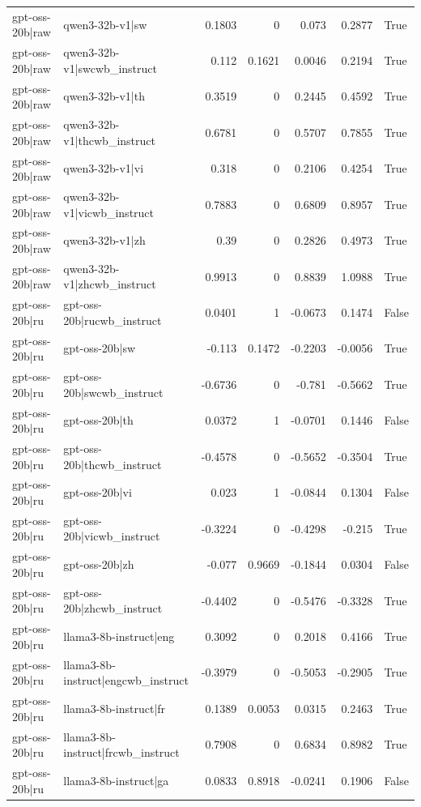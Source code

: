 \begin{table}
\begin{tabular}{l l r r r r l}
gpt-oss-20b|raw & qwen3-32b-v1|sw & 0.1803 & 0 & 0.073 & 0.2877 & True \\
gpt-oss-20b|raw & qwen3-32b-v1|swcwb_instruct & 0.112 & 0.1621 & 0.0046 & 0.2194 & True \\
gpt-oss-20b|raw & qwen3-32b-v1|th & 0.3519 & 0 & 0.2445 & 0.4592 & True \\
gpt-oss-20b|raw & qwen3-32b-v1|thcwb_instruct & 0.6781 & 0 & 0.5707 & 0.7855 & True \\
gpt-oss-20b|raw & qwen3-32b-v1|vi & 0.318 & 0 & 0.2106 & 0.4254 & True \\
gpt-oss-20b|raw & qwen3-32b-v1|vicwb_instruct & 0.7883 & 0 & 0.6809 & 0.8957 & True \\
gpt-oss-20b|raw & qwen3-32b-v1|zh & 0.39 & 0 & 0.2826 & 0.4973 & True \\
gpt-oss-20b|raw & qwen3-32b-v1|zhcwb_instruct & 0.9913 & 0 & 0.8839 & 1.0988 & True \\
gpt-oss-20b|ru & gpt-oss-20b|rucwb_instruct & 0.0401 & 1 & -0.0673 & 0.1474 & False \\
gpt-oss-20b|ru & gpt-oss-20b|sw & -0.113 & 0.1472 & -0.2203 & -0.0056 & True \\
gpt-oss-20b|ru & gpt-oss-20b|swcwb_instruct & -0.6736 & 0 & -0.781 & -0.5662 & True \\
gpt-oss-20b|ru & gpt-oss-20b|th & 0.0372 & 1 & -0.0701 & 0.1446 & False \\
gpt-oss-20b|ru & gpt-oss-20b|thcwb_instruct & -0.4578 & 0 & -0.5652 & -0.3504 & True \\
gpt-oss-20b|ru & gpt-oss-20b|vi & 0.023 & 1 & -0.0844 & 0.1304 & False \\
gpt-oss-20b|ru & gpt-oss-20b|vicwb_instruct & -0.3224 & 0 & -0.4298 & -0.215 & True \\
gpt-oss-20b|ru & gpt-oss-20b|zh & -0.077 & 0.9669 & -0.1844 & 0.0304 & False \\
gpt-oss-20b|ru & gpt-oss-20b|zhcwb_instruct & -0.4402 & 0 & -0.5476 & -0.3328 & True \\
gpt-oss-20b|ru & llama3-8b-instruct|eng & 0.3092 & 0 & 0.2018 & 0.4166 & True \\
gpt-oss-20b|ru & llama3-8b-instruct|engcwb_instruct & -0.3979 & 0 & -0.5053 & -0.2905 & True \\
gpt-oss-20b|ru & llama3-8b-instruct|fr & 0.1389 & 0.0053 & 0.0315 & 0.2463 & True \\
gpt-oss-20b|ru & llama3-8b-instruct|frcwb_instruct & 0.7908 & 0 & 0.6834 & 0.8982 & True \\
gpt-oss-20b|ru & llama3-8b-instruct|ga & 0.0833 & 0.8918 & -0.0241 & 0.1906 & False \\

\end{tabular}
\end{table}
